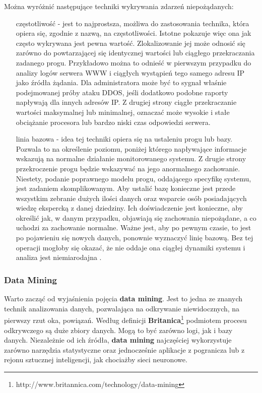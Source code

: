         Można wyróżnić następujące techniki wykrywania zdarzeń niepożądanych:
        \begin{itemize}
            \item[częstotliwość] - jest to najprostsza, możliwa do zastosowania technika, która opiera się,
            zgodnie z nazwą, na częstotliwości. Istotne pokazuje więc ona jak często wykrywana jest pewna wartość.
            Zlokalizowanie jej może odnosić się zarówno do powtarzającej się identycznej wartości lub ciągłego
            przekraczania zadanego progu. Przykładowo można to odnieść w pierwszym przypadku
            do analizy logów serwera WWW i ciągłych wystąpień tego samego adresu IP jako źródła żądania.
            Dla administratora może być to sygnał właśnie podejmowanej próby ataku DDOS, jeśli dodatkowo
            podobne raporty napływają dla innych adresów IP. Z drugiej strony ciągłe przekraczanie wartości
            maksymalnej lub minimalnej, oznaczać może wysokie i stałe obciążanie procesora lub bardzo
            niski czas odpowiedzi serwera. 
            \item[linia bazowa] - idea tej techniki opiera się na ustaleniu progu lub bazy. Pozwala to
            na określenie poziomu, poniżej którego napływające informacje wskazują na normalne działanie
            monitorowanego systemu. Z drugie strony przekroczenie progu będzie wskazywać na jego
            anormalnego zachowanie. Niestety, podanie poprawnego modelu progu, oddającego
            specyfikę systemu, jest zadaniem skomplikowanym. Aby ustalić bazę konieczne jest przede wszystkim
            zebranie dużych ilości danych oraz wsparcie osób posiadających wiedzę ekspercką z danej dziedziny.
            Ich doświadczenie jest konieczne, aby określić jak, w danym przypadku, objawiają się zachowania
            niepożądane, a co uchodzi za zachowanie normalne. Ważne jest, aby po pewnym czasie, to jest
            po pojawieniu się nowych danych, ponownie wyznaczyć linię bazową. Bez tej operacji mogłoby się okazać,
            że nie oddaje ona ciągłej dynamiki systemu i analiza jest niemiarodajna \cite{logging_log_management}.
        \end{itemize}
        
        \subsubsection{Data Mining}
        Warto zacząć od wyjaśnienia pojęcia \textbf{data mining}. Jest to jedna ze znanych technik analizowania
        danych, pozwalająca na odkrywanie niewidocznych, na pierwszy rzut oka, powiązań. Według definicji
        \textbf{Britanica}\footnote{http://www.britannica.com/technology/data-mining} podmiotem procesu odkrywczego są
        duże zbiory danych. Mogą to być zarówno logi, jak i bazy danych. Niezależnie od ich źródła, 
        \textbf{data mining} najczęściej wykorzystuje zarówno narzędzia statystyczne oraz jednocześnie aplikacje
        z pogranicza lub z rejonu sztucznej inteligencji, jak chociażby sieci neuronowe.
        
